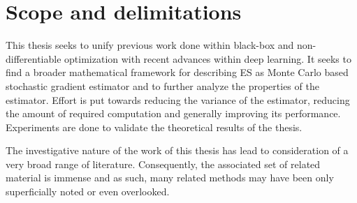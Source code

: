 
\section{Scope and delimitations}
This thesis seeks to unify previous work done within black-box and non-differentiable optimization with recent advances within deep learning. It seeks to find a broader mathematical framework for describing \gls{ES} as Monte Carlo based stochastic gradient estimator and to further analyze the properties of the estimator. Effort is put towards reducing the variance of the estimator, reducing the amount of required computation and generally improving its performance. Experiments are done to validate the theoretical results of the thesis.

The investigative nature of the work of this thesis has lead to consideration of a very broad range of literature. Consequently, the associated set of related material is immense and as such, many related methods may have been only superficially noted or even overlooked. 







